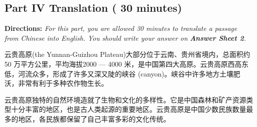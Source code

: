 \documentclass[UTF8,11pt]{ctexart}
\begin{document}
\subsection*{\textbf{Part IV Translation ( 30 minutes)}}


\textbf{Directions: }\textit{For this part, you are allowed 30 minutes to translate a passage from Chinese into English. You should} \textit{write your answer on }\textbf{\textit{Answer Sheet 2}}\textit{.}


云贵高原(the Yunnan-Guizhou Plateau)大部分位于云南、贵州省境内，总面积约50 万平方公里，平均海拔2000 — 4000 米，是中国第四大高原。云贵高原西高东低，河流众多，形成了许多又深又陡的峡谷 (canyon)。峡谷中许多地方土壤肥沃，非常有利于多种农作物生长。


云贵高原独特的自然环境造就了生物和文化的多样性。它是中国森林和矿产资源类型十分丰富的地区，也是古人类起源的重要地区。云贵高原是中国少数民族数量最多的地区，各民族都保留了自己丰富多彩的文化传统。
\end{document}
